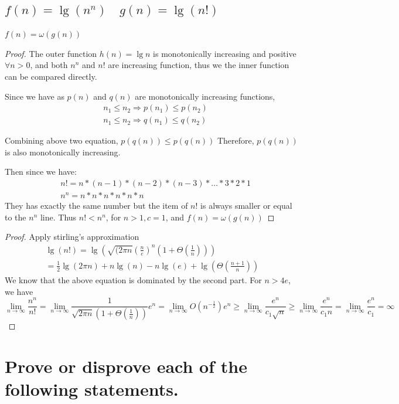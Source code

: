 \documentclass[a4paper]{article}
\begin{document}
\subsection{$ f(n)=\lg \left(n^ n\right)  \quad  g(n)=\lg (n !)$}
$f(n)=\omega (g(n))$
\begin{proof}
The outer function $h(n)=\lg n$ is monotonically increasing and positive $\forall n >0$, and both $n^n$ and $n!$ are increasing function, thus we the inner function can be compared directly. 

Since we have as $p(n)$ and $q(n)$ are monotonically increasing functions,
$$
\begin{aligned}
&n_1 \leq n_2 \Longrightarrow p(n_1) \leq p(n_2) \\
&n_1 \leq n_2 \Longrightarrow q(n_1) \leq q(n_2)
\end{aligned}
$$

Combining above two equation, $p(q(n)) \leq p(q(n))$
Therefore, $p(q(n))$ is also monotonically increasing.

Then since we have:
$$\begin{aligned}
  &n !=n *(n-1) *(n-2) *(n-3) * \ldots * 3 * 2 * 1 \\
  &n^n =n * n * n * n * n * n
  \end{aligned}$$
They has exactly the same number but the item of $n!$ is always smaller or equal to the $n^n$ line. Thus $n!<n^n$, for $n>1, c=1 $, and $f(n)=\omega (g(n))$
\end{proof}
\begin{proof}
  Apply stirling's approximation
$$
\begin{gathered}
\lg (n !)=\lg \left(\sqrt{(2 \pi n}\left(\frac{n}{e}\right)^n\left(1+\Theta\left(\frac{1}{n}\right)\right)\right) \\
=\frac{1}{2} \lg (2 \pi n)+n \lg (n)-n \lg (e)+\lg \left(\Theta\left(\frac{n+1}{n}\right)\right)
\end{gathered}
$$
We know that the above equation is dominated by the second part. For $n>4 e$,  we have
$$
\lim _{n \rightarrow \infty} \frac{n^n}{n !}=\lim _{n \rightarrow \infty} \frac{1}{\sqrt{2 \pi n}\left(1+\Theta\left(\frac{1}{n}\right)\right)} e^n=\lim _{n \rightarrow \infty} O\left(n^{-\frac12}\right) e^n \geq \lim _{n \rightarrow \infty} \frac{e^n}{c_1 \sqrt{n}} 
\geq \lim _{n \rightarrow \infty} \frac{e^n}{c_1 n}=\lim _{n \rightarrow \infty} \frac{e^n}{c_1}=\infty
$$
\end{proof}
\section{Prove or disprove each of the following statements.} 
\end{document}
